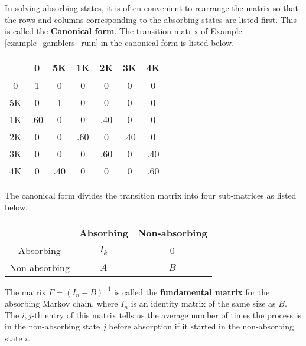 \begin{solution}
    In solving absorbing states, it is often convenient to rearrange the matrix so that the rows and columns corresponding to the absorbing states are listed first. This is called the \textbf{Canonical form}. The transition matrix of Example \ref{example_gamblers_ruin} in the canonical form is listed below.

    \begin{center}
        \begin{tabular}{c|cc|cccc}
               & 0   & 5K  & 1K  & 2K  & 3K  & 4K  \\
            \hline
            0  & 1   & 0   & 0   & 0   & 0   & 0   \\
            5K & 0   & 1   & 0   & 0   & 0   & 0   \\
            \hline
            1K & .60 & 0   & 0   & .40 & 0   & 0   \\
            2K & 0   & 0   & .60 & 0   & .40 & 0   \\
            3K & 0   & 0   & 0   & .60 & 0   & .40 \\
            4K & 0   & .40 & 0   & 0   & 0   & .60 \\
        \end{tabular}
    \end{center}

    The canonical form divides the transition matrix into four sub-matrices as listed below.

    \begin{center}
        \begin{tabular}{c|cc}
                          & Absorbing & Non-absorbing \\
            \hline
            Absorbing     & $I_k$     & 0             \\
            Non-absorbing & $A$       & $B$           \\
        \end{tabular}
    \end{center}

    The matrix \( F = (I_n - B)^{-1} \) is called the \textbf{fundamental matrix} for the absorbing Markov chain, where \( I_n \) is an identity matrix of the same size as \( B \). The \( i,j \)-th entry of this matrix tells us the average number of times the process is in the non-absorbing state \( j \) before absorption if it started in the non-absorbing state \( i \).



\end{solution}
